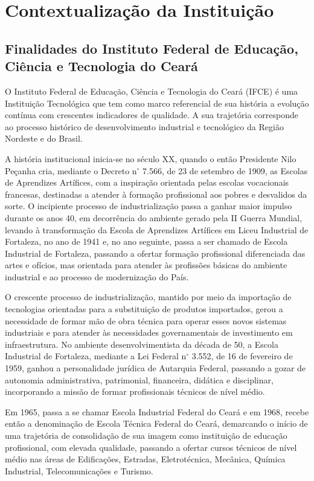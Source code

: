 \documentclass[
	12pt,				%
	openright,			%
	twoside,			%
	a4paper,			%
	chapter=TITLE,		%
	english,			%
	french,				%
	spanish,			%
	brazil,				%
	]{abntex2}
\begin{document}
\chapter{Contextualização da Instituição}

\section{Finalidades do Instituto Federal de Educação, Ciência e Tecnologia do Ceará}


O Instituto Federal de Educação, Ciência e Tecnologia do Ceará (IFCE) é uma Instituição Tecnológica que tem como marco referencial de sua história a evolução contínua com crescentes indicadores de qualidade. A sua trajetória corresponde ao processo histórico de desenvolvimento industrial e tecnológico da Região Nordeste e do Brasil.

A história institucional inicia-se no século XX, quando o então Presidente Nilo Peçanha cria, mediante o Decreto n$^\circ$  7.566, de 23 de setembro de 1909, as Escolas de Aprendizes Artífices, com a inspiração orientada pelas escolas vocacionais francesas, destinadas a atender à formação profissional aos pobres e desvalidos da sorte. O incipiente processo de industrialização passa a ganhar maior impulso durante os anos 40, em decorrência do ambiente gerado pela II Guerra Mundial, levando à transformação da Escola de Aprendizes Artífices em Liceu Industrial de Fortaleza, no ano de 1941 e, no ano seguinte, passa a ser chamado de Escola Industrial de Fortaleza, passando a ofertar formação profissional diferenciada das artes e ofícios, mas orientada para atender às profissões básicas do ambiente industrial e ao processo de modernização do País.

O crescente processo de industrialização, mantido por meio da importação de tecnologias orientadas para a substituição de produtos importados, gerou a necessidade de formar mão de obra técnica para operar esses novos sistemas industriais e para atender às necessidades governamentais de investimento em infraestrutura. No ambiente desenvolvimentista da década de 50, a Escola Industrial de Fortaleza, mediante a Lei Federal n$^\circ$ 3.552, de 16 de fevereiro de 1959, ganhou a personalidade jurídica de Autarquia Federal, passando a gozar de autonomia administrativa, patrimonial, financeira, didática e disciplinar, incorporando a missão de formar profissionais técnicos de nível médio.

Em 1965, passa a se chamar Escola Industrial Federal do Ceará e em 1968, recebe então a denominação de Escola Técnica Federal do Ceará, demarcando o início de uma trajetória de consolidação de sua imagem como instituição de educação profissional, com elevada qualidade, passando a ofertar cursos técnicos de nível médio nas áreas de Edificações, Estradas, Eletrotécnica, Mecânica, Química Industrial, Telecomunicações e Turismo.
\end{document}
